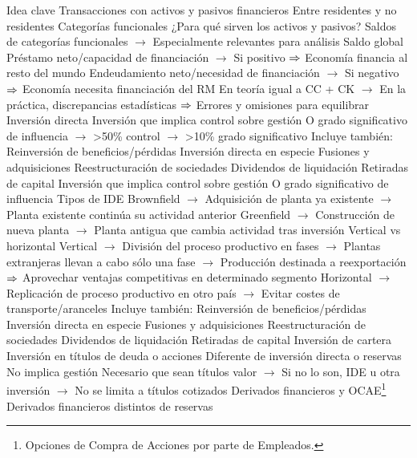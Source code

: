 \documentclass{nuevotema}
\begin{document}
\begin{esquemal}
		\2 Idea clave
			\3 Transacciones con activos y pasivos financieros
				\4[] Entre residentes y no residentes
			\3 Categorías funcionales
				\4[] ¿Para qué sirven los activos y pasivos?
				\4[] Saldos de categorías funcionales
				\4[] $\to$ Especialmente relevantes para análisis
			\3 Saldo global
				\4[] Préstamo neto/capacidad de financiación
				\4[] $\to$ Si positivo
				\4[] $\Rightarrow$ Economía financia al resto del mundo
				\4[] Endeudamiento neto/necesidad de financiación
				\4[] $\to$ Si negativo
				\4[] $\Rightarrow$ Economía necesita financiación del RM
				\4[] En teoría igual a CC + CK
				\4[] $\to$ En la práctica, discrepancias estadísticas
				\4[] $\Rightarrow$ Errores y omisiones para equilibrar
		\2 Inversión directa
			\3 Inversión que implica control sobre gestión
				\4[] O grado significativo de influencia
				\4[] $\to$ >50\% control
				\4[] $\to$ >10\% grado significativo
			\3 Incluye también:
				\4[] Reinversión de beneficios/pérdidas
				\4[] Inversión directa en especie
				\4[] Fusiones y adquisiciones
				\4[] Reestructuración de sociedades
				\4[] Dividendos de liquidación
				\4[] Retiradas de capital
			\3 Inversión que implica control sobre gestión
				\4[] O grado significativo de influencia
			\3 Tipos de IDE
				\4[] Brownfield
				\4[] $\to$ Adquisición de planta ya existente
				\4[] $\to$ Planta existente continúa su actividad anterior
				\4[] Greenfield
				\4[] $\to$ Construcción de nueva planta
				\4[] $\to$ Planta antigua que cambia actividad tras inversión
			\3 Vertical vs horizontal
				\4[] Vertical
				\4[] $\to$ División del proceso productivo en fases
				\4[] $\to$ Plantas extranjeras llevan a cabo sólo una fase
				\4[] $\to$ Producción destinada a reexportación
				\4[] $\Rightarrow$ Aprovechar ventajas competitivas en determinado segmento
				\4[] Horizontal
				\4[] $\to$ Replicación de proceso productivo en otro país
				\4[] $\to$ Evitar costes de transporte/aranceles
			\3 Incluye también:
				\4[] Reinversión de beneficios/pérdidas
				\4[] Inversión directa en especie
				\4[] Fusiones y adquisiciones
				\4[] Reestructuración de sociedades
				\4[] Dividendos de liquidación
				\4[] Retiradas de capital
		\2 Inversión de cartera
			\3 Inversión en títulos de deuda o acciones
				\4[] Diferente de inversión directa o reservas
				\4[] No implica gestión
				\4[] Necesario que sean títulos valor
				\4[] $\to$ Si no lo son, IDE u otra inversión
				\4[] $\to$ No se limita a títulos cotizados
		\2 Derivados financieros y OCAE\footnote{Opciones de Compra de Acciones por parte de Empleados.}
			\3 Derivados financieros distintos de reservas

\end{esquemal}
\end{document}
